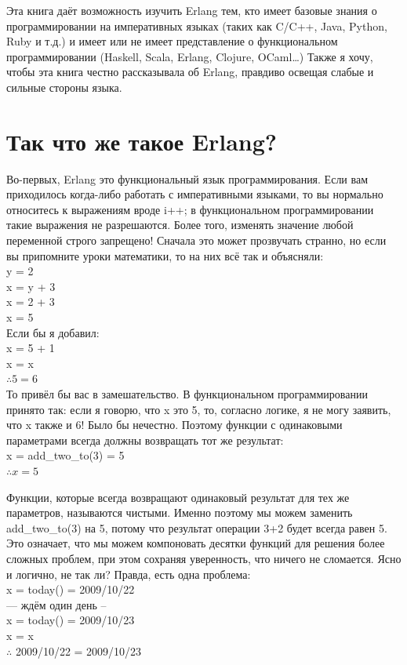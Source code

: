 \documentclass[a4paper,12pt]{report}
\newcommand{\ops}{\colorbox{lgreen}}
\begin{document}
Эта книга даёт возможность изучить Erlang тем, кто имеет базовые знания о программировании на императивных языках (таких как C/C++, Java, Python, Ruby и т.д.) и имеет или не имеет представление о функциональном программировании (Haskell, Scala, Erlang, Clojure, OCaml\ldots) Также я хочу, чтобы эта книга честно рассказывала об Erlang, правдиво освещая слабые и сильные стороны языка.

\section{Так что же такое Erlang?}
Во\--первых, Erlang это функциональный язык программирования. Если вам приходилось когда\--либо работать с императивными языками, то вы нормально относитесь к выражениям вроде \ops{i++;} в функциональном программировании такие выражения не разрешаются. Более того, изменять значение любой переменной строго запрещено! Сначала это может прозвучать странно, но если вы припомните уроки математики, то на них всё так и объясняли:\\ 
y = 2\\ 
x = y + 3\\ 
x = 2 + 3\\ 
x = 5\\ 
Если бы я добавил:\\ 
x = 5 + 1\\ 
x = x\\ 
$\therefore 5 = 6$\\ 

То привёл бы вас в замешательство. В функциональном программировании принято так: если я говорю, что x это 5, то, согласно логике, я не могу заявить, что x также и 6! Было бы нечестно. Поэтому функции с одинаковыми параметрами всегда должны возвращать тот же результат:\\  
x = add\_two\_to(3) = 5\\ 
$\therefore x = 5$
 
Функции, которые  всегда возвращают одинаковый результат для тех же параметров, называются чистыми. Именно поэтому мы можем заменить  \ops{add\_two\_to(3)} на 5, потому что результат операции \ops{3+2} будет всегда равен 5. Это означает, что мы можем компоновать десятки функций для решения более сложных проблем, при этом сохраняя уверенность, что ничего не сломается. Ясно и логично, не так ли? Правда, есть одна проблема:\\ 
x = today() = 2009/10/22\\ 
--- ждём один день --\\ 
x = today() = 2009/10/23\\ 
x = x\\ 
$\therefore$ 2009/10/22 = 2009/10/23 
\end{document}
